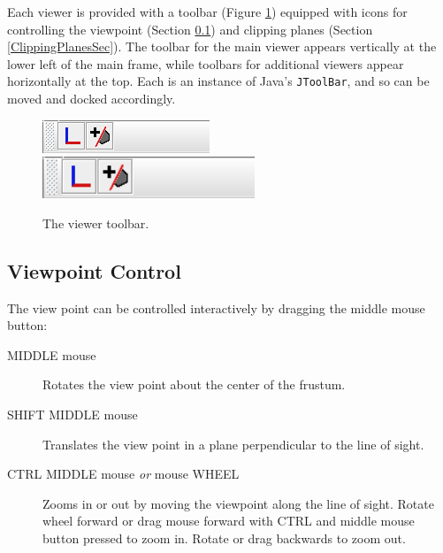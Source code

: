 \documentclass{article}
\begin{document}
Each viewer is provided with a toolbar (Figure \ref{ViewerToolbarFig}) equipped
with icons for controlling the viewpoint (Section \ref{ViewpointControlSec}) and
clipping planes (Section \ref{ClippingPlanesSec}). The toolbar for the main viewer
appears vertically at the lower left of the main frame, while toolbars
for additional viewers appear horizontally at the top.  Each is an
instance of Java's {\tt JToolBar}, and so can be moved and docked
accordingly.

\begin{figure}
\begin{center}
\iflatexml
\includegraphics[]{images/viewerToolbar}
\else
\includegraphics[width=2.5in]{images/viewerToolbar}
\fi
\end{center}
\caption{The viewer toolbar.}%
\label{ViewerToolbarFig}
\end{figure}

\subsection{Viewpoint Control}
\label{ViewpointControlSec}

The view point can be controlled interactively by dragging the middle
mouse button:

\begin{description}

\item[MIDDLE mouse] \mbox{}

Rotates the view point about the center of the frustum.

\item[SHIFT MIDDLE mouse] \mbox{}

Translates the view point in a plane perpendicular to the
line of sight.

\item[CTRL MIDDLE mouse {\it or} mouse WHEEL] \mbox{}

Zooms in or out by moving the viewpoint along the line of sight. Rotate 
wheel forward or drag mouse forward with CTRL and middle mouse button 
pressed to zoom in. Rotate or drag backwards to zoom out.

\end{description}
\end{document}
